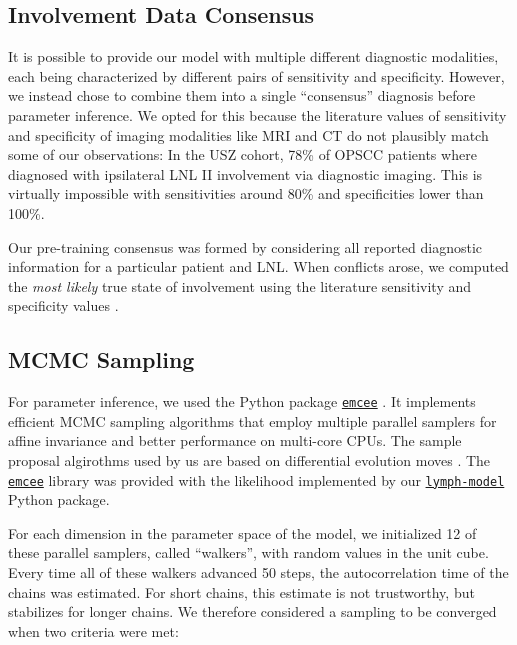 \documentclass[
  sn-mathphys-num,
]{sn-jnl}
\begin{document}
\subsection{Involvement Data
Consensus}\label{involvement-data-consensus}

It is possible to provide our model with multiple different diagnostic
modalities, each being characterized by different pairs of sensitivity
and specificity. However, we instead chose to combine them into a single
``consensus'' diagnosis before parameter inference. We opted for this
because the literature values of sensitivity and specificity
\citep{de_bondt_detection_2007, kyzas_18f-fluorodeoxyglucose_2008} of
imaging modalities like MRI and CT do not plausibly match some of our
observations: In the USZ cohort, 78\% of OPSCC patients where diagnosed
with ipsilateral LNL II involvement via diagnostic imaging. This is
virtually impossible with sensitivities around 80\% and specificities
lower than 100\%.

Our pre-training consensus was formed by considering all reported
diagnostic information for a particular patient and LNL. When conflicts
arose, we computed the \emph{most likely} true state of involvement
using the literature sensitivity and specificity values
\citep{de_bondt_detection_2007, kyzas_18f-fluorodeoxyglucose_2008}.

\subsection{MCMC Sampling}\label{sec-sampling}

For parameter inference, we used the Python package
\href{https://emcee.readthedocs.io/en/stable/}{\texttt{emcee}}
\citep{foreman-mackey_emcee_2013}. It implements efficient MCMC sampling
algorithms that employ multiple parallel samplers for affine invariance
and better performance on multi-core CPUs. The sample proposal
algirothms used by us are based on differential evolution moves
\citep{ter_braak_differential_2008, nelson_run_2013}. The
\href{https://emcee.readthedocs.io/en/stable/}{\texttt{emcee}} library
was provided with the likelihood implemented by our
\href{https://lymph-model.readthedocs.io/en/stable/}{\texttt{lymph-model}}
Python package.

For each dimension in the parameter space of the model, we initialized
12 of these parallel samplers, called ``walkers'', with random values in
the unit cube. Every time all of these walkers advanced 50 steps, the
autocorrelation time of the chains was estimated. For short chains, this
estimate is not trustworthy, but stabilizes for longer chains. We
therefore considered a sampling to be converged when two criteria were
met:
\end{document}
